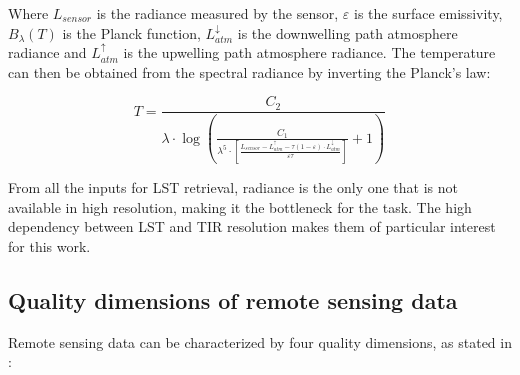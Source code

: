         Where $L_{sensor}$ is the radiance measured by the sensor, $\varepsilon$ is the surface emissivity, $B_{\lambda}(T)$ is the Planck function, $L_{atm}^{\downarrow}$ is the downwelling path atmosphere radiance and $L_{atm}^{\uparrow}$ is the upwelling path atmosphere radiance. 
        The temperature can then be obtained from the spectral radiance by inverting the Planck's law:

        \begin{equation}
            T = \frac{C_2}{\lambda \cdot \log\left(\frac{C_1}{\lambda^5 \cdot \left[ \frac{L_{sensor} - L_{atm}^{\uparrow}- \tau (1 - \varepsilon) \cdot L_{atm}^{\downarrow}}{\varepsilon \tau}  \right]}+1\right)}
        \end{equation}

        From all the inputs for LST retrieval, radiance is the only one that is not available in high resolution, making it the bottleneck for the task. The high dependency between LST and TIR resolution makes them of particular interest for this work.
        
       

    \subsection{Quality dimensions of remote sensing data}

    Remote sensing data can be characterized by four quality dimensions, as stated in \cite{HORNING20082986}:

